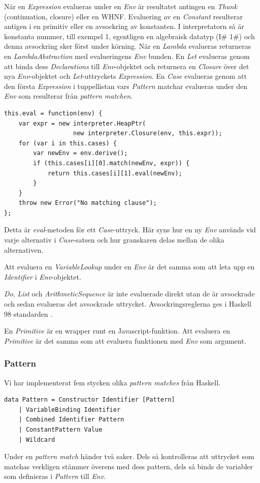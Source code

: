 När en \emph{Expression} evalueras under en \emph{Env} är resultatet antingen en \emph{Thunk} (continuation, closure) eller en WHNF. Evaluering av en \emph{Constant} resulterar antigen i en primitiv eller en avsockring av konstanten. I interpretatorn så är konstanta nummer, till exempel 1, egentligen en algebraisk datatyp (I\# 1\#) och denna avsockring sker först under körning. När en \emph{Lambda} evalueras returneras en \emph{LambdaAbstraction} med evalueringens \emph{Env} bunden. En \emph{Let} evalueras genom att binda dess \emph{Declarations} till \emph{Env}-objektet och returnera en \emph{Closure} över det nya \emph{Env}-objektet och \emph{Let}-uttryckets \emph{Expression}. En \emph{Case} evalueras genom att den första \emph{Expression} i tuppellistan vars \emph{Pattern} matchar evalueras under den \emph{Env} som resulterar från \emph{pattern matchen}.
\begin{lstlisting}
this.eval = function(env) {
    var expr = new interpreter.HeapPtr(
                   new interpreter.Closure(env, this.expr));
    for (var i in this.cases) {
        var newEnv = env.derive();
        if (this.cases[i][0].match(newEnv, expr)) {
            return this.cases[i][1].eval(newEnv);
        }
    }
    throw new Error("No matching clause");
};
\end{lstlisting}
Detta är \emph{eval}-metoden för ett \emph{Case}-uttryck. Här syns hur en ny \emph{Env} används vid varje alternativ i \emph{Case}-satsen och hur granskaren delas mellan de olika alternativen.

Att evaluera en \emph{VariableLookup} under en \emph{Env} är det samma som att leta upp en \emph{Identifier} i \emph{Env}-objektet.

\emph{Do}, \emph{List} och \emph{ArithmeticSequence} är inte evaluerade direkt utan de är avsockrade och sedan evalueras det avsockrade uttrycket. Avsockringsreglerna ges i Haskell 98 standarden \citep{haskell98chap3}.

En \emph{Primitive} är en wrapper runt en Javascript-funktion. Att evaluera en \emph{Primitive} är det samma som att evaluera funktionen med \emph{Env} som argument.

\subsubsection{Pattern}
Vi har implementerat fem stycken olika \emph{pattern matches} från Haskell.
\begin{lstlisting}
data Pattern = Constructor Identifier [Pattern]
    | VariableBinding Identifier
    | Combined Identifier Pattern
    | ConstantPattern Value
    | Wildcard
\end{lstlisting}
Under en \emph{pattern match} händer två saker. Dels så kontrolleras att uttrycket som matchas verkligen stämmer överens med dess pattern, dels så binds de variabler som definieras i \emph{Pattern} till \emph{Env}. 

